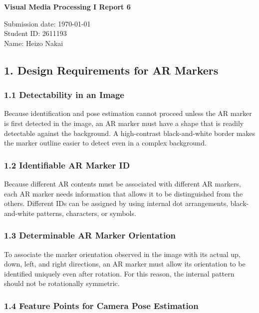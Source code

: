 \documentclass[11pt,a4paper]{article}
\begin{document}
\begin{center}
{\LARGE \textbf{Visual Media Processing I Report 6}}
\end{center}
\vspace{1em}

\begin{flushright}
Submission date: \today \\
Student ID: 2611193 \\
Name: Heizo Nakai
\end{flushright}

\subsection*{1. Design Requirements for AR Markers}

\subsubsection*{1.1 Detectability in an Image}

Because identification and pose estimation cannot proceed unless the AR marker is first detected in the image, an AR marker must have a shape that is readily detectable against the background.
A high-contrast black-and-white border makes the marker outline easier to detect even in a complex background.

\subsubsection*{1.2 Identifiable AR Marker ID}

Because different AR contents must be associated with different AR markers, each AR marker needs information that allows it to be distinguished from the others.
Different IDs can be assigned by using internal dot arrangements, black-and-white patterns, characters, or symbols.

\subsubsection*{1.3 Determinable AR Marker Orientation}

To associate the marker orientation observed in the image with its actual up, down, left, and right directions, an AR marker must allow its orientation to be identified uniquely even after rotation.
For this reason, the internal pattern should not be rotationally symmetric.

\subsubsection*{1.4 Feature Points for Camera Pose Estimation}
\end{document}
